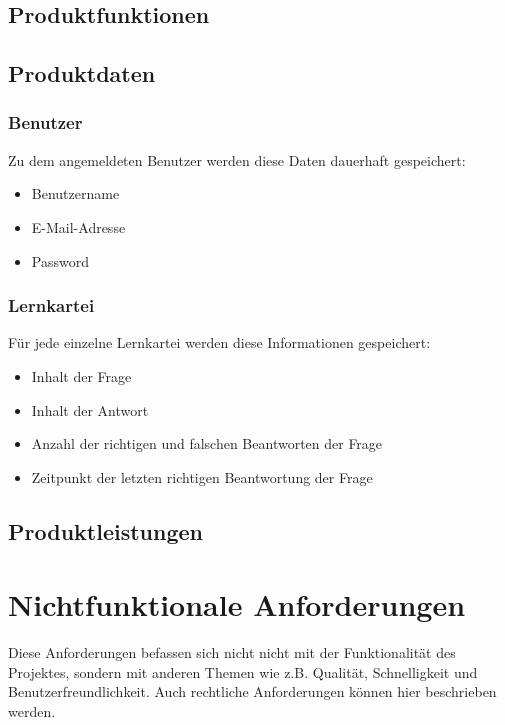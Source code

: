 \subsection{Produktfunktionen}

\subsection{Produktdaten}
\subsubsection{Benutzer}
Zu dem angemeldeten Benutzer werden diese Daten dauerhaft gespeichert:
\begin{itemize}
	\item Benutzername
	\item E-Mail-Adresse
	\item Password
\end{itemize}

\subsubsection{Lernkartei}
Für jede einzelne Lernkartei werden diese Informationen gespeichert:
\begin{itemize}
	\item Inhalt der Frage
	\item Inhalt der Antwort
	\item Anzahl der richtigen und falschen Beantworten der Frage
	\item Zeitpunkt der letzten richtigen Beantwortung der Frage
\end{itemize}

\subsection{Produktleistungen}

\section{Nichtfunktionale Anforderungen}
Diese Anforderungen befassen sich nicht nicht mit der Funktionalität des Projektes, sondern mit anderen Themen wie z.B. Qualität, Schnelligkeit und Benutzerfreundlichkeit. Auch rechtliche Anforderungen können hier beschrieben werden.

